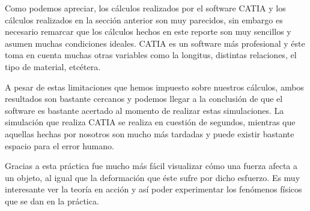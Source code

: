 \documentclass[12pt, letterpaper]{article}
\begin{document}
Como podemos apreciar, los cálculos realizados por el software CATIA y los cálculos realizados en la sección anterior son muy parecidos, sin embargo es necesario remarcar que los cálculos hechos en este reporte son muy sencillos y asumen muchas condiciones ideales. CATIA es un software más profesional y éste toma en cuenta muchas otras variables como la longitus, distintas relaciones, el tipo de material, etcétera.

A pesar de estas limitaciones que hemos impuesto sobre nuestros cálculos, ambos resultados son bastante cercanos y podemos llegar a la conclusión de que el software es bastante acertado al momento de realizar estas simulaciones. La simulación que realiza CATIA se realiza en cuestión de segundos, mientras que aquellas hechas por nosotros son mucho más tardadas y puede existir bastante espacio para el error humano.

Gracias a esta práctica fue mucho más fácil visualizar cómo una fuerza afecta a un objeto, al igual que la deformación que éste sufre por dicho esfuerzo. Es muy interesante ver la teoría en acción y así poder experimentar los fenómenos físicos que se dan en la práctica.
\renewcommand\refname{Referencias}
\printbibliography
\end{document}
